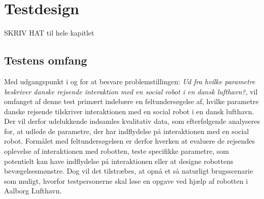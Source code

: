 \chapter{Testdesign}
\label{ParametreTestdesign}
%
SKRIV HAT til hele kapitlet 
%
\section{Testens omfang}
\label{ParametreTestensOmfang}
%
Med udgangspunkt i og for at besvare problemstillingen: \textit{Ud fra hvilke parametre beskriver danske rejsende interaktion med en social robot i en dansk lufthavn?}, vil omfanget af denne test primært indebære en feltundersøgelse af, hvilke parametre danske rejsende tilskriver interaktionen med en social robot i en dansk lufthavn. Der vil derfor udelukkende indsamles kvalitativ data, som efterfølgende analyseres for, at udlede de parametre, der har indflydelse på interaktionen med en social robot. Formålet med feltundersøgelsen er derfor hverken at evaluere de rejsendes oplevelse af interaktionen med robotten, teste specifikke parametre, som potentielt kan have indflydelse på interaktionen eller at designe robottens bevægelsesmønstre. Dog vil det tilstræbes, at opnå et så naturligt brugsscenarie som muligt, hvorfor testpersonerne skal løse en opgave ved hjælp af robotten i Aalborg Lufthavn. 
 
 
 



